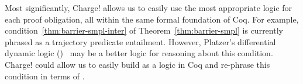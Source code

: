 Most significantly, Charge! allows us to easily use the most appropriate
logic for each proof obligation, all within the same formal foundation of
Coq. For example, condition~\eqref{thm:barrier-smpl-inter} of
Theorem~\ref{thm:barrier-smpl} is currently phrased as a trajectory
predicate entailment. However, Platzer's differential dynamic logic
(\dL{})~\cite{Platzer15substitution} may be a better logic for reasoning
about this condition. Charge! could allow us to easily build \dL{} as a
logic in Coq and re-phrase this condition in terms of \dL{}.




